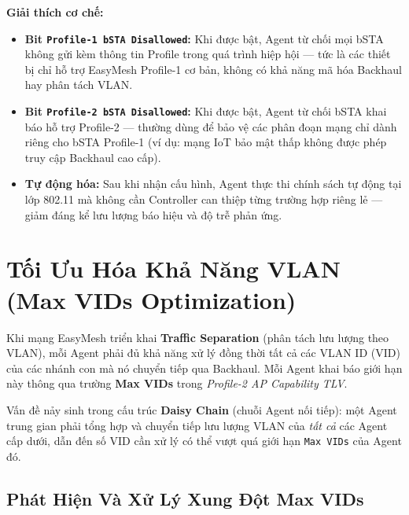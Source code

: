 \textbf{Giải thích cơ chế:}
\begin{itemize}
	\item \textbf{Bit \texttt{Profile-1 bSTA Disallowed}:} Khi được bật, Agent từ chối
	mọi bSTA không gửi kèm thông tin Profile trong quá trình hiệp hội --- tức là
	các thiết bị chỉ hỗ trợ EasyMesh Profile-1 cơ bản, không có khả năng mã hóa
	Backhaul hay phân tách VLAN.
	\item \textbf{Bit \texttt{Profile-2 bSTA Disallowed}:} Khi được bật, Agent từ chối
	bSTA khai báo hỗ trợ Profile-2 --- thường dùng để bảo vệ các phân đoạn mạng
	chỉ dành riêng cho bSTA Profile-1 (ví dụ: mạng IoT bảo mật thấp không được
	phép truy cập Backhaul cao cấp).
	\item \textbf{Tự động hóa:} Sau khi nhận cấu hình, Agent thực thi chính sách tự
	động tại lớp 802.11 mà không cần Controller can thiệp từng trường hợp riêng
	lẻ --- giảm đáng kể lưu lượng báo hiệu và độ trễ phản ứng.
\end{itemize}


\section{Tối Ưu Hóa Khả Năng VLAN (Max VIDs Optimization)}

Khi mạng EasyMesh triển khai \textbf{Traffic Separation} (phân tách lưu lượng theo
VLAN), mỗi Agent phải đủ khả năng xử lý đồng thời tất cả các VLAN ID (VID) của các
nhánh con mà nó chuyển tiếp qua Backhaul. Mỗi Agent khai báo giới hạn này thông qua
trường \textbf{Max VIDs} trong \textit{Profile-2 AP Capability TLV}.

Vấn đề nảy sinh trong cấu trúc \textbf{Daisy Chain} (chuỗi Agent nối tiếp): một Agent
trung gian phải tổng hợp và chuyển tiếp lưu lượng VLAN của \textit{tất cả} các Agent
cấp dưới, dẫn đến số VID cần xử lý có thể vượt quá giới hạn \texttt{Max VIDs} của
Agent đó.


\subsection{Phát Hiện Và Xử Lý Xung Đột Max VIDs}

